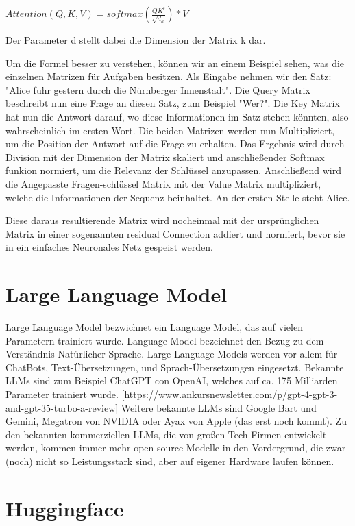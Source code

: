 $Attention(Q,K,V)=softmax(\frac{QK^t}{\sqrt{d_k}})*V$

Der Parameter d stellt dabei die Dimension der Matrix k dar.


Um die Formel besser zu verstehen, können wir an einem Beispiel sehen, was die einzelnen Matrizen für Aufgaben besitzen.
Als Eingabe nehmen wir den Satz: "Alice fuhr gestern durch die Nürnberger Innenstadt".
Die Query Matrix beschreibt nun eine Frage an diesen Satz, zum Beispiel "Wer?".
Die Key Matrix hat nun die Antwort darauf, wo diese Informationen im Satz stehen könnten, also wahrscheinlich im ersten Wort. 
Die beiden Matrizen werden nun Multipliziert, um die Position der Antwort auf die Frage zu erhalten. 
Das Ergebnis wird durch Division mit der Dimension der Matrix skaliert und anschließender Softmax funkion normiert, um die Relevanz der Schlüssel anzupassen.
Anschließend wird die Angepasste Fragen-schlüssel Matrix mit der Value Matrix multipliziert, welche die Informationen der Sequenz beinhaltet. 
An der ersten Stelle steht Alice.

Diese daraus resultierende Matrix wird nocheinmal mit der ursprünglichen Matrix in einer sogenannten residual Connection addiert und normiert, bevor sie in ein einfaches Neuronales Netz gespeist werden.

\section{Large Language Model}

Large Language Model bezwichnet ein Language Model, das auf vielen Parametern trainiert wurde. 
Language Model bezeichnet den Bezug zu dem Verständnis Natürlicher Sprache.
Large Language Models werden vor allem für ChatBots, Text-Übersetzungen, und Sprach-Übersetzungen eingesetzt.
Bekannte LLMs sind zum Beispiel ChatGPT con OpenAI, welches auf ca. 175 Milliarden Parameter trainiert wurde. [https://www.ankursnewsletter.com/p/gpt-4-gpt-3-and-gpt-35-turbo-a-review]
Weitere bekannte LLMs sind Google Bart und Gemini, Megatron von NVIDIA oder Ayax von Apple (das erst noch kommt).
Zu den bekannten kommerziellen LLMs, die von großen Tech Firmen entwickelt werden, kommen immer mehr open-source Modelle in den Vordergrund, die zwar (noch) nicht so Leistungsstark sind, aber auf eigener Hardware laufen können.



\section{Huggingface}

